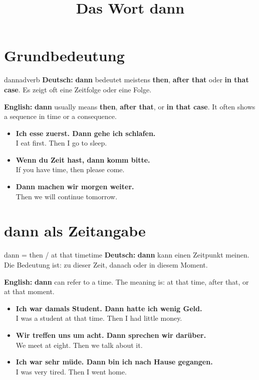 \documentclass[a4paper,11pt]{article}
\title{Das Wort \glqq dann\grqq}
\date{}
\newcommand{\GermanText}[1]{\textbf{Deutsch: }#1\par}
\newcommand{\EnglishText}[1]{{\small\color{SoftGray}\textbf{English: }#1\par}}
\newcommand{\ExampleItem}[2]{\item \textbf{#1}\\{\small\color{SoftGray}#2}}
\begin{document}
    \maketitle
    \tableofcontents
    \newpage

\section{Grundbedeutung}

\begin{grammarentry}{dann}{adverb}
\GermanText{\textbf{dann} bedeutet meistens \textbf{then}, \textbf{after that} oder \textbf{in that case}. Es zeigt oft eine Zeitfolge oder eine Folge.}
\EnglishText{\textbf{dann} usually means \textbf{then}, \textbf{after that}, or \textbf{in that case}. It often shows a sequence in time or a consequence.}

\begin{exbox}
\begin{itemize}
    \ExampleItem{Ich esse zuerst. Dann gehe ich schlafen.}{I eat first. Then I go to sleep.}
    \ExampleItem{Wenn du Zeit hast, dann komm bitte.}{If you have time, then please come.}
    \ExampleItem{Dann machen wir morgen weiter.}{Then we will continue tomorrow.}
\end{itemize}
\end{exbox}
\end{grammarentry}

\section{dann als Zeitangabe}

\begin{grammarentry}{dann = then / at that time}{time}
\GermanText{\textbf{dann} kann einen Zeitpunkt meinen. Die Bedeutung ist: zu dieser Zeit, danach oder in diesem Moment.}
\EnglishText{\textbf{dann} can refer to a time. The meaning is: at that time, after that, or at that moment.}

\begin{exbox}
\begin{itemize}
    \ExampleItem{Ich war damals Student. Dann hatte ich wenig Geld.}{I was a student at that time. Then I had little money.}
    \ExampleItem{Wir treffen uns um acht. Dann sprechen wir darüber.}{We meet at eight. Then we talk about it.}
    \ExampleItem{Ich war sehr müde. Dann bin ich nach Hause gegangen.}{I was very tired. Then I went home.}
\end{itemize}
\end{exbox}
\end{grammarentry}
\end{document}
